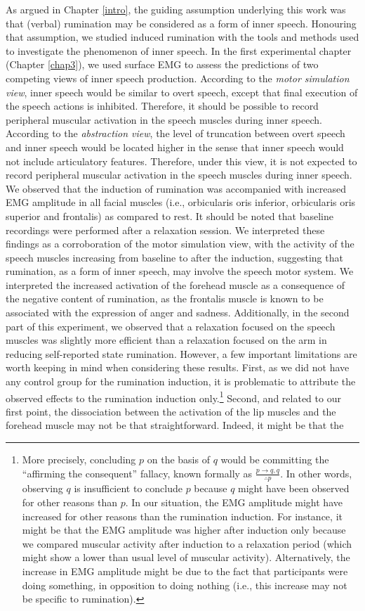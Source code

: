 \documentclass[a4paper,12pt,twoside,onecolumn,openright,final,oldfontcommands]{memoir}
\let\rmarkdownfootnote\footnote%
\def\footnote{\protect\rmarkdownfootnote}
\begin{document}
As argued in Chapter \ref{intro}, the guiding assumption underlying this work was that (verbal) rumination may be considered as a form of inner speech. Honouring that assumption, we studied induced rumination with the tools and methods used to investigate the phenomenon of inner speech. In the first experimental chapter (Chapter \ref{chap3}), we used surface EMG to assess the predictions of two competing views of inner speech production. According to the \emph{motor simulation view}, inner speech would be similar to overt speech, except that final execution of the speech actions is inhibited. Therefore, it should be possible to record peripheral muscular activation in the speech muscles during inner speech. According to the \emph{abstraction view}, the level of truncation between overt speech and inner speech would be located higher in the sense that inner speech would not include articulatory features. Therefore, under this view, it is not expected to record peripheral muscular activation in the speech muscles during inner speech. We observed that the induction of rumination was accompanied with increased EMG amplitude in all facial muscles (i.e., orbicularis oris inferior, orbicularis oris superior and frontalis) as compared to rest. It should be noted that baseline recordings were performed after a relaxation session. We interpreted these findings as a corroboration of the motor simulation view, with the activity of the speech muscles increasing from baseline to after the induction, suggesting that rumination, as a form of inner speech, may involve the speech motor system. We interpreted the increased activation of the forehead muscle as a consequence of the negative content of rumination, as the frontalis muscle is known to be associated with the expression of anger and sadness. Additionally, in the second part of this experiment, we observed that a relaxation focused on the speech muscles was slightly more efficient than a relaxation focused on the arm in reducing self-reported state rumination. However, a few important limitations are worth keeping in mind when considering these results. First, as we did not have any control group for the rumination induction, it is problematic to attribute the observed effects to the rumination induction only.\footnote{More precisely, concluding \(p\) on the basis of \(q\) would be committing the \enquote{affirming the consequent} fallacy, known formally as \(\frac{p \rightarrow q, q}{\therefore p}\). In other words, observing \(q\) is insufficient to conclude \(p\) because \(q\) might have been observed for other reasons than \(p\). In our situation, the EMG amplitude might have increased for other reasons than the rumination induction. For instance, it might be that the EMG amplitude was higher after induction only because we compared muscular activity after induction to a relaxation period (which might show a lower than usual level of muscular activity). Alternatively, the increase in EMG amplitude might be due to the fact that participants were doing something, in opposition to doing nothing (i.e., this increase may not be specific to rumination).} Second, and related to our first point, the dissociation between the activation of the lip muscles and the forehead muscle may not be that straightforward. Indeed, it might be that the 
\end{document}

